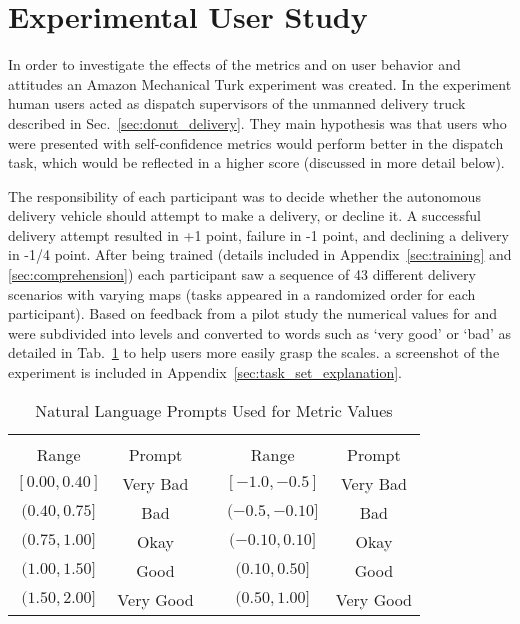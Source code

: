 \section{Experimental User Study} \label{sec:methodology}
    In order to investigate the effects of the metrics \xQ{} and \xO{} on user behavior and attitudes an Amazon Mechanical Turk experiment was created. In the experiment human users acted as dispatch supervisors of the unmanned delivery truck described in Sec.~\ref{sec:donut_delivery}. They main hypothesis was that users who were presented with self-confidence metrics would perform better in the dispatch task, which would be reflected in a higher score (discussed in more detail below).

    The responsibility of each participant was to decide whether the autonomous delivery vehicle should attempt to make a delivery, or decline it. A successful delivery attempt resulted in +1 point, failure in -1 point, and declining a delivery in -1/4 point. After being trained (details included in Appendix~\ref{sec:training} and \ref{sec:comprehension}) each participant saw a sequence of 43 different delivery scenarios with varying maps (tasks appeared in a randomized order for each participant). Based on feedback from a pilot study the numerical values for \xQ{} and \xO{} were subdivided into levels and converted to words such as `very good' or `bad' as detailed in Tab.~\ref{tab:word_ranges} to help users more easily grasp the scales. a screenshot of the experiment is included in Appendix~\ref{sec:task_set_explanation}.

    \begin{table}[]
        \caption{Natural Language Prompts Used for Metric Values}
        \label{tab:word_ranges}
        \begin{tabular}{cclcc}
            \multicolumn{2}{c}{\xQ{}} & \vline & \multicolumn{2}{c}{\xO{}} \\
            Range & Prompt & \vline & Range & Prompt \\
            \hline
            $[0.00,0.40]$ & Very Bad & \vline & $[-1.0,-0.5]$ & Very Bad \\
            $(0.40,0.75]$ & Bad & \vline & $(-0.5,-0.10]$ & Bad \\
            $(0.75,1.00]$ & Okay & \vline & $(-0.10,0.10]$ & Okay \\
            $(1.00,1.50]$ & Good & \vline & $(0.10,0.50]$ & Good \\
            $(1.50,2.00]$ & Very Good & \vline & $(0.50,1.00]$ & Very Good
        \end{tabular}
    \end{table}

